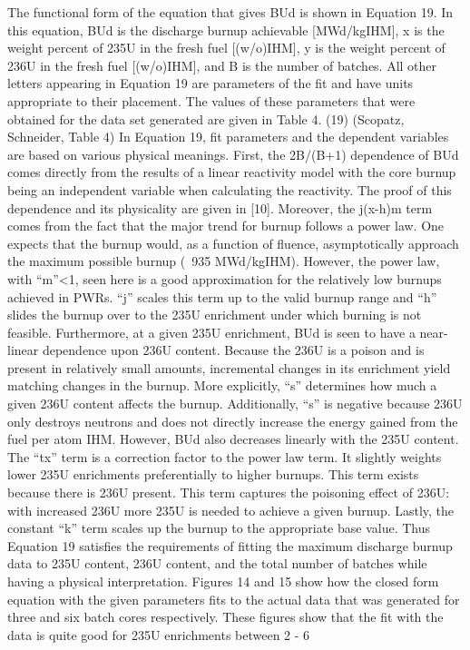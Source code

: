 The functional form of the equation that gives BUd is shown in Equation 19.  In this equation, BUd is the discharge burnup achievable [MWd/kgIHM], x is the weight percent of 235U in the fresh fuel [(w/o)IHM], y is the weight percent of 236U in the fresh fuel [(w/o)IHM], and B is the number of batches.  All other letters appearing in Equation 19 are parameters of the fit and have units appropriate to their placement.  The values of these parameters that were obtained for the data set generated are given in Table 4.
        (19)
(Scopatz, Schneider, Table 4)
In Equation 19, fit parameters and the dependent variables are based on various physical meanings.  First, the 2B/(B+1) dependence of BUd comes directly from the results of a linear reactivity model with the core burnup being an independent variable when calculating the reactivity.  The proof of this dependence and its physicality are given in [10]. Moreover, the j(x-h)m term comes from the fact that the major trend for burnup follows a power law. One expects that the burnup would, as a function of fluence, asymptotically approach the maximum possible burnup (~935 MWd/kgIHM).  However, the power law, with “m”<1, seen here is a good approximation for the relatively low burnups achieved in PWRs. “j” scales this term up to the valid burnup range and “h” slides the burnup over to the 235U enrichment under which burning is not feasible.
Furthermore, at a given 235U enrichment, BUd is seen to have a near-linear dependence upon 236U content.  Because the 236U is a poison and is present in relatively small amounts, incremental changes in its enrichment yield matching changes in the burnup.  More explicitly, “s” determines how much a given 236U content affects the burnup.  Additionally, “s” is negative because 236U only destroys neutrons and does not directly increase the energy gained from the fuel per atom IHM.  However, BUd also decreases linearly with the 235U content.  The “tx” term is a correction factor to the power law term.  It slightly weights lower 235U enrichments preferentially to higher burnups.  This term exists because there is 236U present.  This term captures the poisoning effect of 236U: with increased 236U more 235U is needed to achieve a given burnup.  Lastly, the constant “k” term scales up the burnup to the appropriate base value.
Thus Equation 19 satisfies the requirements of fitting the maximum discharge burnup data to 235U content, 236U content, and the total number of batches while having a physical interpretation.  
Figures 14 and 15 show how the closed form equation with the given parameters fits to the actual data that was generated for three and six batch cores respectively.  These figures show that the fit with the data is quite good for 235U enrichments between 2 - 6%
